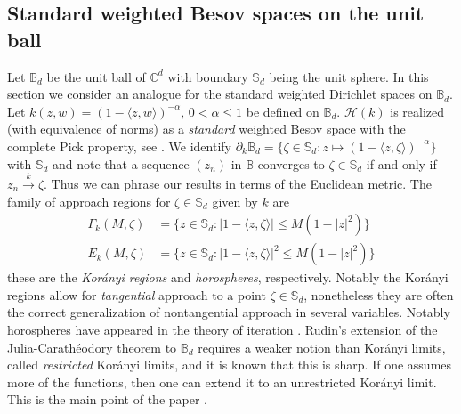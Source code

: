 \documentclass[leqno, final]{article}
\theoremstyle{definition}
\newcommand{\xto}[1]{\stackrel{#1}{\to}}
\newcommand{\ball}{\mathbb{B}}
\newcommand{\plane}{\mathbb{C}}
\newcommand{\sphere}{\mathbb{S}}
\newcommand{\Hilbert}{\mathcal{H}}
\newcommand{\rand}{\partial}
\newcommand{\la}{\langle}
\newcommand{\ra}{\rangle}
\begin{document}
\subsection{Standard weighted Besov spaces on the unit ball}\label{section:besov}
Let $\ball_d$ be the unit ball of $\plane^d$ with boundary $\sphere_d$ being the unit sphere.
In this section we consider an analogue for the standard weighted Dirichlet spaces on $\ball_d$.
Let $k(z,w) = (1-\la z,w\ra)^{-\alpha},\,0<\alpha\leq1$ be defined on $\ball_d$.
$\Hilbert(k)$ is realized (with equivalence of norms) as a \emph{standard} weighted
Besov space with the complete Pick property, see \cite{hartz_besov}. We
identify $\rand_k\ball_d = \{\zeta\in\sphere_d:z\mapsto(1-\la z,\zeta\ra)^{-\alpha}\}$
with $\sphere_d$ and note that a sequence $(z_n)$ in $\ball$ converges to $\zeta\in\sphere_d$ if
and only if $z_n\xto{k}\zeta$. Thus we can phrase our results in terms of the Euclidean
metric. The family of approach regions for $\zeta\in\sphere_d$ given by $k$ are
\begin{align*}
	\Gamma_k(M,\zeta) &= \{z\in\sphere_d: |1-\la z,\zeta\ra|  \leq M(1-|z|^2)\} \\
	E_k(M,\zeta)      &= \{z\in\sphere_d: |1-\la z,\zeta\ra|^2\leq M(1-|z|^2)\}
\end{align*}
these are the \emph{Korányi regions} and \emph{horospheres}, respectively.
Notably the Korányi regions allow for \emph{tangential} approach to a
point $\zeta\in\sphere_d$, nonetheless they are often the correct
generalization of nontangential approach in several variables.
Notably horospheres have appeared in the theory of iteration \cite{abate_horospheres}.
Rudin's extension \cite{rudin_unit-ball} of the Julia-Carathéodory theorem to
$\ball_d$ requires a weaker notion than Korányi limits, called \emph{restricted}
Korányi limits, and it is known that this is sharp. If one assumes more of
the functions, then one can extend it to an unrestricted Korányi limit. This is
the main point of the paper \cite{jury_julia-caratheodory}.
\end{document}
